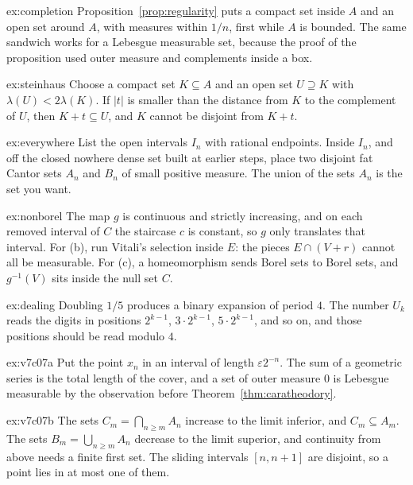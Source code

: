 \begin{hint}{ex:completion}
Proposition~\ref{prop:regularity} puts a compact set inside $A$ and an open set around $A$, with measures within $1/n$, first while $A$ is bounded.
The same sandwich works for a Lebesgue measurable set, because the proof of the proposition used outer measure and complements inside a box.
\end{hint}

\begin{hint}{ex:steinhaus}
Choose a compact set $K\subseteq A$ and an open set $U\supseteq K$ with $\lambda(U)<2\lambda(K)$.
If $|t|$ is smaller than the distance from $K$ to the complement of $U$, then $K+t\subseteq U$, and $K$ cannot be disjoint from $K+t$.
\end{hint}

\begin{hint}{ex:everywhere}
List the open intervals $I_n$ with rational endpoints.
Inside $I_n$, and off the closed nowhere dense set built at earlier steps, place two disjoint fat Cantor sets $A_n$ and $B_n$ of small positive measure.
The union of the sets $A_n$ is the set you want.
\end{hint}

\begin{hint}{ex:nonborel}
The map $g$ is continuous and strictly increasing, and on each removed interval of $C$ the staircase $c$ is constant, so $g$ only translates that interval.
For (b), run Vitali's selection inside $E$: the pieces $E\cap(V+r)$ cannot all be measurable.
For (c), a homeomorphism sends Borel sets to Borel sets, and $g^{-1}(V)$ sits inside the null set $C$.
\end{hint}

\begin{hint}{ex:dealing}
Doubling $1/5$ produces a binary expansion of period $4$.
The number $U_k$ reads the digits in positions $2^{k-1}$, $3\cdot 2^{k-1}$, $5\cdot 2^{k-1}$, and so on, and those positions should be read modulo $4$.
\end{hint}

\begin{hint}{ex:v7c07a}
Put the point $x_n$ in an interval of length $\varepsilon 2^{-n}$.
The sum of a geometric series is the total length of the cover, and a set of outer measure $0$ is Lebesgue measurable by the observation before Theorem~\ref{thm:caratheodory}.
\end{hint}

\begin{hint}{ex:v7c07b}
The sets $C_m=\bigcap_{n\ge m}A_n$ increase to the limit inferior, and $C_m\subseteq A_m$.
The sets $B_m=\bigcup_{n\ge m}A_n$ decrease to the limit superior, and continuity from above needs a finite first set.
The sliding intervals $[n,n+1]$ are disjoint, so a point lies in at most one of them.
\end{hint}

